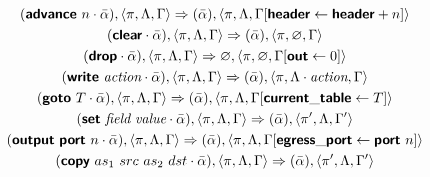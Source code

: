 \begin{mdframed}
\begin{gather*}
  (\bm{\mathsf{{advance}}}~n \cdot \bar\alpha), \langle \pi, \Lambda, \Gamma \rangle
  \Rightarrow
  (\bar\alpha), \langle \pi, \Lambda, \Gamma[\bm{\mathsf{{header}}}
  \leftarrow \bm{\mathsf{{header}}} + n] \rangle
\\
  (\bm{\mathsf{{clear}}} \cdot \bar\alpha), \langle \pi, \Lambda, \Gamma \rangle
  \Rightarrow
  (\bar\alpha), \langle \pi, \varnothing, \Gamma \rangle
\\
  (\bm{\mathsf{{drop}}} \cdot \bar\alpha), \langle \pi, \Lambda, \Gamma \rangle
  \Rightarrow
  \varnothing, \langle \pi, \varnothing, \Gamma [\bm{\mathsf{{out}}} \leftarrow 0] \rangle
\\
  (\bm{\mathsf{{write}}} \ \textit{action} \cdot \bar\alpha), \langle \pi, \Lambda,
  \Gamma \rangle
  \Rightarrow
  (\bar\alpha), \langle \pi, \Lambda \cdot \textit{action}, \Gamma \rangle
\\
  (\bm{\mathsf{{goto}}} \ T \cdot \bar\alpha),
  \langle \pi, \Lambda, \Gamma \rangle
  \Rightarrow
  (\bar\alpha), \langle \pi, \Lambda,
  \Gamma[\bm{\mathsf{{current\_table}}} \leftarrow T] \rangle
\\
  (\bm{\mathsf{{set}}} \ \textit{field} \ \textit{value} \cdot \bar\alpha), \langle \pi,
  \Lambda, \Gamma \rangle
  \Rightarrow
  (\bar\alpha), \langle \pi', \Lambda, \Gamma' \rangle
\\
  (\bm{\mathsf{{output}}} \ \bm{\mathsf{{port}}} \ n \cdot \bar \alpha), \langle \pi, \Lambda,
  \Gamma \rangle
  \Rightarrow
  (\bar\alpha), \langle \pi, \Lambda, \Gamma[\bm{\mathsf{{egress\_port}}}
  \leftarrow \bm{\mathsf{{port}}} \ n] \rangle
\\
  (\bm{\mathsf{{copy}}} \ as_1 \ src \ as_2 \ dst \cdot \bar\alpha), \langle \pi,
  \Lambda, \Gamma \rangle
  \Rightarrow
  (\bar\alpha), \langle \pi', \Lambda, \Gamma' \rangle
\end{gather*}
\end{mdframed}

